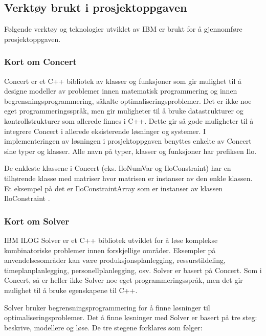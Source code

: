 \subsection{Verktøy brukt i prosjektoppgaven}
Følgende verktøy og teknologier utviklet av IBM er brukt for å gjennomføre prosjektoppgaven.

\subsubsection{Kort om Concert}
Concert er et C++ bibliotek av klasser og funksjoner som gir mulighet til å designe modeller av problemer innen matematisk programmering og innen begrensningsprogrammering, såkalte optimaliseringsproblemer. Det er ikke noe eget programmeringsspråk, men gir muligheter til å bruke datastrukturer og kontrollstrukturer som allerede finnes i C++. Dette gir så gode muligheter til å integrere Concert i allerede eksisterende løsninger og systemer. I implementeringen av løsningen i prosjektoppgaven benyttes enkelte av Concert sine typer og klasser. Alle navn på typer, klasser og funksjoner har prefiksen Ilo.

De enkleste klassene i Concert (eks. IloNumVar og IloConstraint) har en tilhørende klasse med matriser hvor matrisen er instanser av den enkle klassen. Et eksempel på det er IloConstraintArray som er instanser av klassen IloConstraint
\cite{cpconcertilog}.

\subsubsection{Kort om Solver}
IBM ILOG Solver er et C++ bibliotek utviklet for å løse komplekse kombinatoriske problemer innen forskjellige områder. Eksempler på anvendelsesområder kan være produksjonsplanlegging, ressurstildeling, timeplanplanlegging, personellplanlegging, osv. Solver er basert på Concert. Som i Concert, så er heller ikke Solver noe eget programmeringsspråk, men det gir mulighet til å bruke egenskapene til C++.

Solver bruker begrensningsprogrammering for å finne løsninger til optimaliseringsproblemer. Det å finne løsninger med Solver er basert på tre steg: beskrive, modellere og løse. De tre stegene forklares som følger:

